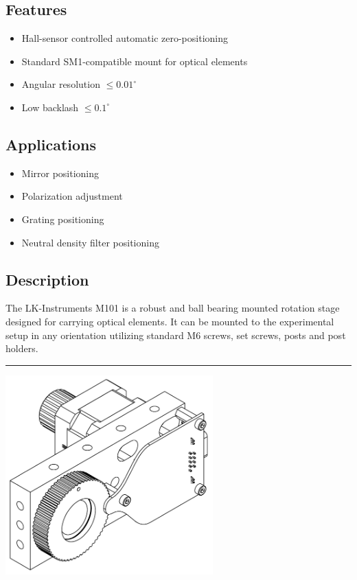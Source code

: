\documentclass[a4paper, final, 12pt, oneside]{scrartcl}
\numberwithin{equation}{section}
\numberwithin{table}{section}
\numberwithin{figure}{section}
\begin{document}
\begin{multicols}{2}
\subsection*{Features}
\begin{itemize}
  \item[] Hall-sensor controlled automatic zero-positioning
  \item[] Standard SM1-compatible mount for optical elements
  \item[] Angular resolution $\leq 0.01^{\circ}$
  \item[] Low backlash $\leq 0.1^{\circ}$
\end{itemize}
\FloatBarrier

\subsection*{Applications}
\begin{itemize}
  \item[] Mirror positioning
  \item[] Polarization adjustment
  \item[] Grating positioning
  \item[] Neutral density filter positioning
\end{itemize}
\FloatBarrier

\subsection*{Description}
The LK-Instruments M101 is a robust and ball bearing mounted rotation
stage designed for carrying optical elements. It can be mounted to the
experimental setup in any orientation utilizing standard M6 screws, set screws,
posts and post holders.
\end{multicols}
\noindent\rule{\textwidth}{0.4pt}
\vspace*{0.5cm}

\centerline{\includegraphics[width=0.6\textwidth]{./drawings/m101_full_dwg.pdf}}
\end{document}
